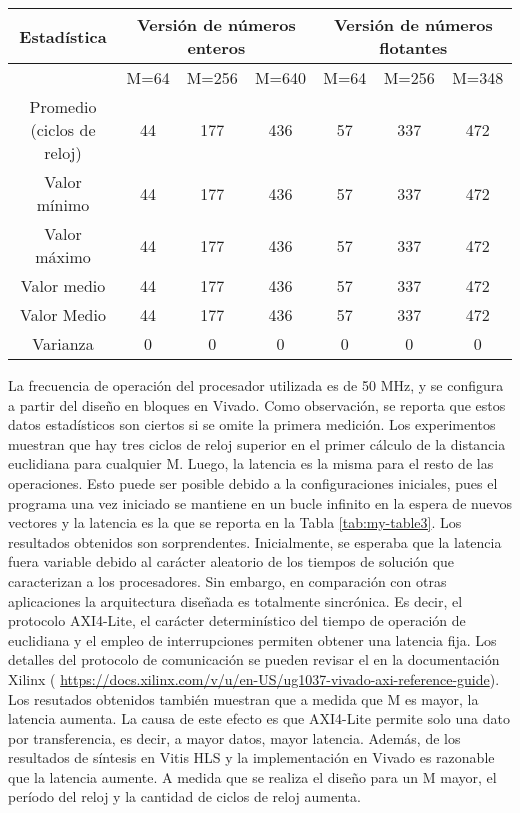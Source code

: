 \documentclass[conference]{IEEEtran}
\begin{document}
\begin{table*}[]
\centering
\caption{Estadística de la latencia para una frecuencia de operación  de 50 MHz en la CPU }
\label{tab:my-table3}
\begin{tabular}{ccccccc}
\hline
Estadística & \multicolumn{3}{c}{Versión de números enteros} & \multicolumn{3}{c}{Versión de números flotantes} \\ \hline
             & M=64 & M=256 & M=640 & M=64 & M=256 & M=348 \\ \hline
Promedio (ciclos de reloj)    & 44   & 177   & 436   &   57   &  337     & 472       \\ \hline
Valor mínimo & 44   & 177   & 436   &   57   &  337     & 472       \\ \hline
Valor máximo & 44   & 177   & 436   &   57   &     337  & 472       \\ \hline
Valor medio  & 44   & 177   & 436   &   57   &  337     & 472       \\ \hline
Valor Medio  & 44   & 177   & 436   &   57   &     337  & 472       \\ \hline
Varianza     & 0    & 0     & 0     &   0   &   0    &   0    \\ \hline
\end{tabular}
\end{table*}
La frecuencia de operación del procesador utilizada es de 50 MHz, y se configura a partir del diseño en bloques en Vivado. Como observación, se reporta que estos datos estadísticos son ciertos si se omite la primera medición. Los experimentos muestran que hay tres  ciclos de reloj superior  en el primer cálculo de la distancia euclidiana para cualquier M. Luego, la latencia es la misma para el resto de las operaciones. Esto puede ser posible debido  a la configuraciones iniciales, pues el programa una vez iniciado se mantiene en un bucle infinito en la espera de nuevos vectores y la latencia es la que se reporta en la Tabla \ref{tab:my-table3}. Los resultados obtenidos son sorprendentes. Inicialmente, se esperaba que la latencia fuera variable debido al carácter aleatorio de los tiempos de solución que caracterizan a los procesadores. Sin embargo, en comparación con otras aplicaciones  la arquitectura diseñada es totalmente sincrónica. Es decir, el protocolo AXI4-Lite, el carácter determinístico del tiempo de operación de euclidiana y el empleo de interrupciones permiten obtener una latencia fija. Los detalles del protocolo de comunicación se pueden revisar el en la documentación Xilinx ( \url{https://docs.xilinx.com/v/u/en-US/ug1037-vivado-axi-reference-guide}). Los resutados obtenidos también muestran que a medida que M es mayor, la latencia aumenta.  La causa de este efecto es que AXI4-Lite permite solo una dato por transferencia, es decir, a mayor datos,  mayor latencia. Además, de los resultados de síntesis en Vitis HLS y la implementación en Vivado es razonable que la latencia aumente. A medida que se realiza el diseño para un M mayor, el período del reloj  y la cantidad de ciclos de reloj aumenta. 
\end{document}
